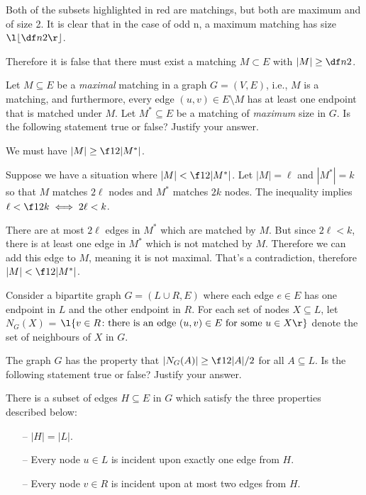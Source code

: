 \documentclass[a4paper]{article}
\begin{document}
Both of the subsets highlighted in red are matchings, but both are maximum and of size 2. It is clear that in the case of odd n, a maximum matching has size $\l\lfloor \df n2 \r\rfloor$.

Therefore it is false that there must exist a matching $M \subset E$ with $|M| \ge \df n2$.



\begin{questionbody}
Let $M \subseteq E$ be a \textit{maximal} matching in a graph $G = (V, E)$, i.e., $M$ is a matching, and furthermore, every edge $(u, v) \in E \setminus M$ has at least one endpoint that is matched under $M$. Let $M^* \subseteq E$ be a matching of \textit{maximum} size in $G$. Is the following statement true or false? Justify your answer.

We must have $|M| \ge \f12 |M^*|$.
\end{questionbody}

Suppose we have a situation where $|M| < \f12 |M^*|$. Let $|M| = \ell$ and $|M^*| = k$ so that $M$ matches $2\ell$ nodes and $M^*$ matches $2k$ nodes. The inequality implies $\ell < \f12 k \iff 2\ell < k$.

There are at most $2\ell$ edges in $M^*$ which are matched by $M$. But since $2\ell < k$, there is at least one edge in $M^*$ which is not matched by $M$. Therefore we can add this edge to $M$, meaning it is not maximal. That's a contradiction, therefore $|M| < \f12 |M^*|$.



\begin{questionbody}
Consider a bipartite graph $G = (L \cup R, E)$ where each edge $e \in E$ has one endpoint in $L$ and the other endpoint in $R$. For each set of nodes $X \subseteq L$, let $N_G(X)$ = $\l\{v \in R \colon \text{there is an edge } (u, v) \in E \text{ for some } u \in X \r\}$ denote the set of neighbours of $X$ in $G$.

The graph $G$ has the property that $|N_G(A)| \ge \f12 |A|/2$ for all $A \subseteq L$. Is the following statement true or false? Justify your answer. 

There is a subset of edges $H \subseteq E$ in $G$ which satisfy the three properties described below:
\vspace*{-1em}
\begin{itemize}
	\item[--] $|H| = |L|$.
	\item[--] Every node $u \in L$ is incident upon exactly one edge from $H$.
	\item[--] Every node $v \in R$ is incident upon at most two edges from $H$.
\end{itemize}
\end{questionbody}
\end{document}
